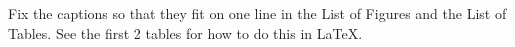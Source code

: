 
Fix the captions so that they fit on one line in the List of Figures and the List of Tables. See the first 2 tables for how to do this in LaTeX. 
\tableofcontents
\newpage
{}
\listoffigures
\newpage
{}
\listoftables
